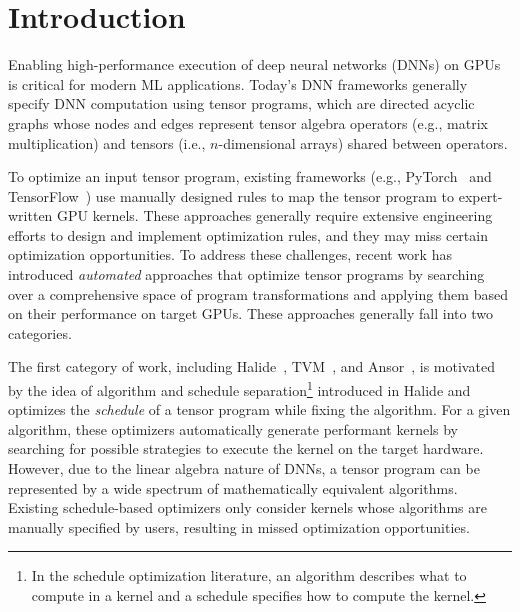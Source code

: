 \section{Introduction}
\label{sec:intro}

Enabling high-performance execution of deep neural networks (DNNs) on GPUs is critical for modern ML applications. 
Today's DNN frameworks generally specify DNN computation using tensor programs, which are directed acyclic graphs whose nodes and edges represent tensor algebra operators (e.g., matrix multiplication) and tensors (i.e., $n$-dimensional arrays) shared between operators. 

To optimize an input tensor program, existing frameworks (e.g., PyTorch~\cite{pytorch} and TensorFlow~\cite{Tensorflow}) use manually designed rules to map the tensor program to expert-written GPU kernels.
These approaches generally require extensive engineering efforts to design and implement optimization rules, and they may miss certain optimization opportunities.
To address these challenges, recent work has introduced {\em automated} approaches that optimize tensor programs by searching over a comprehensive space of program transformations and applying them based on their performance on target GPUs.
These approaches generally fall into two categories.

The first category of work, including Halide~\cite{halide}, TVM~\cite{tvm}, and Ansor~\cite{ansor}, is motivated by the idea of algorithm and schedule separation\footnote{In the schedule optimization literature, an algorithm describes what to compute in a kernel and a schedule specifies how to compute the kernel.} introduced in Halide and optimizes the {\em schedule} of a tensor program while fixing the algorithm.
%
For a given algorithm, these optimizers automatically generate performant kernels by searching for possible strategies to execute the kernel on the target hardware.
However, due to the linear algebra nature of DNNs, a tensor program can be represented by a wide spectrum of mathematically equivalent algorithms. Existing schedule-based optimizers only consider kernels whose algorithms are manually specified by users, resulting in missed optimization opportunities.

